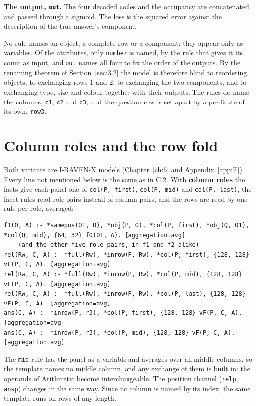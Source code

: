 \textbf{The output, \texttt{out}.} The four decoded codes and the occupancy are concatenated and passed through a sigmoid. The loss is the squared error against the description of the true answer's component.

No rule names an object, a complete row or a component; they appear only as variables. Of the attributes, only \texttt{number} is named, by the rule that gives it its count as input, and \texttt{out} names all four to fix the order of the outputs. By the renaming theorem of Section~\ref{sec:3.2} the model is therefore blind to reordering objects, to exchanging rows 1 and 2, to exchanging the two components, and to exchanging type, size and colour together with their outputs. The rules do name the columns, \texttt{c1}, \texttt{c2} and \texttt{c3}, and the question row is set apart by a predicate of its own, \texttt{row3}.

\section{Column roles and the row fold}\label{sec:C.4}

Both variants are I-RAVEN-X models (Chapter~\ref{ch:6} and Appendix~\ref{app:E}). Every line not mentioned below is the same as in C.2. With \textbf{column roles} the facts give each panel one of \texttt{col(P, first)}, \texttt{col(P, mid)} and \texttt{col(P, last)}, the facet rules read role pairs instead of column pairs, and the rows are read by one rule per role, averaged:

\begin{Verbatim}[fontsize=\small,breaklines]
f1(O, A) :- *samepos(O1, O), *obj(P, O), *col(P, first), *obj(Q, O1), *col(Q, mid), {64, 32} f0(O1, A). [aggregation=avg]
    (and the other five role pairs, in f1 and f2 alike)
rel(Rw, C, A) :- *full(Rw), *inrow(P, Rw), *col(P, first), {128, 128} vF(P, C, A). [aggregation=avg]
rel(Rw, C, A) :- *full(Rw), *inrow(P, Rw), *col(P, mid), {128, 128} vF(P, C, A). [aggregation=avg]
rel(Rw, C, A) :- *full(Rw), *inrow(P, Rw), *col(P, last), {128, 128} vF(P, C, A). [aggregation=avg]
ans(C, A) :- *inrow(P, r3), *col(P, first), {128, 128} vF(P, C, A). [aggregation=avg]
ans(C, A) :- *inrow(P, r3), *col(P, mid), {128, 128} vF(P, C, A). [aggregation=avg]
\end{Verbatim}

The \texttt{mid} rule has the panel as a variable and averages over all middle columns, so the template names no middle column, and any exchange of them is built in: the operands of Arithmetic become interchangeable. The position channel (\texttt{relp}, \texttt{ansp}) changes in the same way. Since no column is named by its index, the same template runs on rows of any length.

